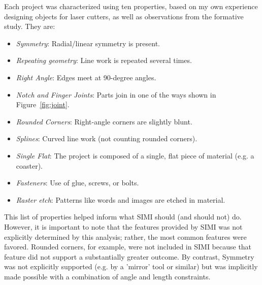 

Each project was characterized using ten properties, based on my own
experience designing objects for laser cutters, as well as
observations from the formative study. They are:

\begin{itemize}
\item \textit{Symmetry}: Radial/linear symmetry is present.
\item \textit{Repeating geometry}: Line work is repeated several times.
\item \textit{Right Angle}: Edges meet at 90-degree angles.
\item \textit{Notch and Finger Joints}: Parts join in one of the ways
  shown in Figure~\ref{fig:joint}.
\item \textit{Rounded Corners}: Right-angle corners are slightly blunt.
\item \textit{Splines}: Curved line work (not counting rounded corners).
\item \textit{Single Flat}: The project is composed of a single, flat
  piece of material (e.g. a coaster).
\item \textit{Fasteners}: Use of glue, screws, or bolts.
\item \textit{Raster etch}: Patterns like words and images are etched
  in material.
\end{itemize}

This list of properties helped inform what SIMI should (and should
not) do. However, it is important to note that the features provided
by SIMI was not explicitly determined by this analysis; rather, the
most common features were favored. Rounded corners, for example, were
not included in SIMI because that feature did not support a
substantially greater outcome. By contrast, Symmetry was not
explicitly supported (e.g. by a 'mirror' tool or similar) but was
implicitly made possible with a combination of angle and length
constraints.






